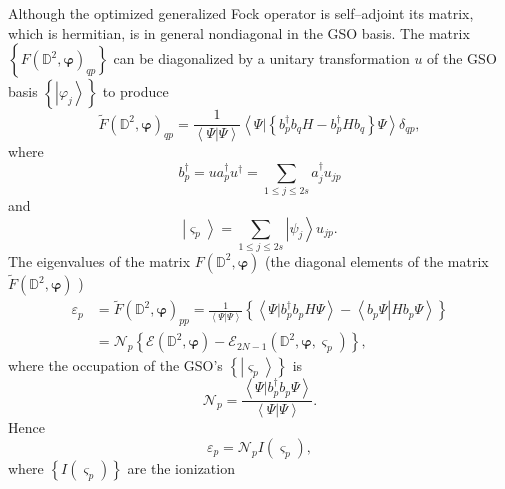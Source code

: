 \documentclass[aps,preprint]{revtex4}%
\begin{document}
Although the optimized generalized Fock operator is self--adjoint its matrix,
which is hermitian, is in general nondiagonal in the GSO basis. The matrix
$\left\{  F\left(  \mathbb{D}^{2},\bm{\varphi}\right)  _{qp}\right\}  $ can be
diagonalized by a unitary transformation $u$ of the GSO basis $\left\{
\left\vert \varphi_{j}\right\rangle \right\}  $ to produce
\begin{equation}
\tilde{F}\left(  \mathbb{D}^{2},\bm{\varphi}\right)  _{qp}=\frac
{1}{\left\langle \left.  \Psi\right\vert \Psi\right\rangle }\left\langle
\left.  \Psi\right\vert \left\{  b_{p}^{\dagger}b_{q}H-b_{p}^{\dagger}%
Hb_{q}\right\}  \Psi\right\rangle \delta_{qp},
\end{equation}
where
\begin{equation}
b_{p}^{\dagger}=ua_{p}^{\dagger}u^{\dagger}=\sum_{1\leq j\leq2s}a_{j}%
^{\dagger}u_{jp}%
\end{equation}
and
\begin{equation}
\left\vert \varsigma_{p}\right\rangle =\sum_{1\leq j\leq2s}\left\vert \psi
_{j}\right\rangle u_{jp}.
\end{equation}
The eigenvalues of the matrix $F\left(  \mathbb{D}^{2},\bm{\varphi}\right)  $
(the diagonal elements of the matrix $\tilde{F}\left(  \mathbb{D}%
^{2},\bm{\varphi}\right)  $ )
\begin{align}
\varepsilon_{p}  &  =\tilde{F}\left(  \mathbb{D}^{2},\bm{\varphi}\right)
_{pp}=\frac{1}{\left\langle \left.  \Psi\right\vert \Psi\right\rangle
}\left\{  \left\langle \left.  \Psi\right\vert b_{p}^{\dagger}b_{p}%
H\Psi\right\rangle -\left\langle \left.  b_{p}\Psi\right\vert Hb_{p}%
\Psi\right\rangle \right\} \nonumber\\
&  =\mathcal{N}_{p}\left\{  \mathcal{E}\left(  \mathbb{D}^{2}%
,\bm{\varphi }\right)  -\mathcal{E}_{2N-1}\left(  \mathbb{D}^{2}%
,\bm{\varphi,}\varsigma_{p}\right)  \right\}  ,
\end{align}
where the occupation of the GSO's $\left\{  \left\vert \varsigma
_{p}\right\rangle \right\}  $ is
\begin{equation}
\mathcal{N}_{p}=\frac{\left\langle \left.  \Psi\right\vert b_{p}^{\dagger
}b_{p}\Psi\right\rangle }{\left\langle \left.  \Psi\right\vert \Psi
\right\rangle }.
\end{equation}
Hence
\begin{equation}
\varepsilon_{p}=\mathcal{N}_{p}I\left(  \varsigma_{p}\right)  ,
\end{equation}
where $\left\{  I\left(  \varsigma_{p}\right)  \right\}  $ are the ionization
\end{document}
